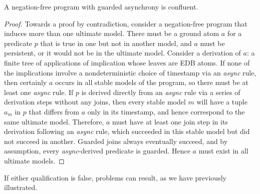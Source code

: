 \begin{lemma}
\label{lem:guarding}
A negation-free \lang program with guarded asynchrony is confluent.
\end{lemma}
\begin{proof}


Towards a proof by contradiction, consider a negation-free \lang program that 
induces more than one ultimate model.  There must be a ground atom $a$ for a predicate $p$
that is true in one but
not in another model, and $a$ must be persistent, or it would not be
in the ultimate model.  Consider a derivation of $a$: a finite tree of applications of
implication whose leaves are EDB atoms.  If none of the implications involve a nondeterministic
choice of timestamp via an {\em async} rule, then certainly 
$a$ occurs in all stable models of the program,
so there must be at least one {\em async} rule.  
If $p$ is derived directly from 
an {\em async} rule via a series of derivation steps without any joins, then every stable
model $m$ will have a tuple $a_m$ in $p$ that differs from $a$ only in its timestamp, 
and hence correspond to the same ultimate model.
Therefore, $a$ must have at least one join step in its derivation following an {\em async} rule,
which succeeded in this stable model but did not succeed in another.  Guarded joins always
eventually succeed, and by assumption, every {\em async}-derived predicate is guarded.
Hence $a$ must exist in all ultimate models.

\end{proof}


If either qualification is false, problems can result, as we have previously illustrated.


